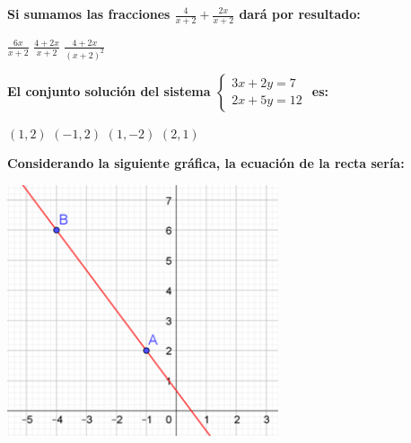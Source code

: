 \documentclass[11pt, addpoints, answers]{exam}
\begin{document}
\begin{questions}
		
		
		\question[1] \textbf{Si sumamos las fracciones $\frac{4}{x+2} + \frac{2x}{x+2}$ dará por resultado:}
		
		  	
		\begin{oneparchoices} %
			\choice $\frac{6x}{x+2}$
			\choice $\frac{4+2x}{x+2}$
			\choice $\frac{4+2x}{(x+2)^2}$
		\end{oneparchoices}
		
		\vspace{1cm}

		
		
		\question[1] \textbf{El conjunto solución del sistema $\begin{cases} 3x+2y=7 \\ 2x+5y=12 \end{cases}$ es:}
		
		\begin{oneparchoices}
			\textbf{\choice} $(1, 2)$
			\textbf{\choice} $(-1, 2)$
			\textbf{\choice} $(1, -2)$
			\textbf{\choice} $(2, 1)$
		\end{oneparchoices}
		
		
		\question[1] \textbf{Considerando la siguiente gráfica, la ecuación de la recta sería:}
		\begin{center}
			\includegraphics[width=0.6\textwidth]{image_248acc.png}
		

\end{center}
\end{questions}
\end{document}
